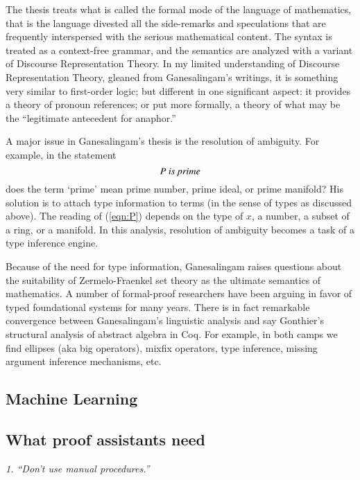 \documentclass{llncs}
\begin{document}
The thesis treats what is called the formal mode of the language of
mathematics, that is the language divested all the side-remarks and
speculations that are frequently interspersed with the serious
mathematical content.  The syntax is treated as a context-free
grammar, and the semantics are analyzed with a variant of Discourse
Representation Theory.  In my limited understanding of Discourse
Representation Theory, gleaned from Ganesalingam's writings, it is
something very similar to first-order logic; but different in one
significant aspect: it provides a theory of pronoun references; or put
more formally, a theory of what may be the ``legitimate antecedent for
anaphor.''

A major issue in Ganesalingam's thesis is the resolution of ambiguity.
For example, in the statement
\begin{equation}\label{eqn:P}
P \text{\it ~is prime}
\end{equation}
does the term `prime' mean prime number, prime ideal, or prime
manifold?  His solution is to attach type information to terms (in the
sense of types as discussed above).  The reading of (\ref{eqn:P})
depends on the type of $x$, a number, a subset of a ring, or a
manifold.  In this analysis, resolution of ambiguity becomes a task of
a type inference engine.  

Because of the need for type information, Ganesalingam raises
questions about the suitability of Zermelo-Fraenkel set theory as the
ultimate semantics of mathematics.  A number of formal-proof
researchers have been arguing in favor of typed foundational systems
for many years.  There is in fact remarkable convergence between
Ganesalingam's linguistic analysis and say Gonthier's structural
analysis of abstract algebra in Coq. For example, in both camps we find
ellipses (aka  big operators), mixfix operators, type inference, missing
argument inference mechanisms, etc.


\subsection{Machine Learning}

\subsection{What proof assistants need}

\def\princ#1{\smallskip\hfill\break\smallskip\centerline{\it #1\hfill}}

\princ{1. ``Don't use manual procedures.''~\cite{XX}}
\end{document}
